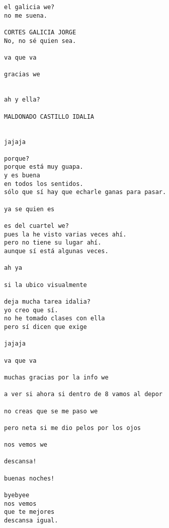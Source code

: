 \begin{verbatim}
el galicia we?
no me suena.

CORTES GALICIA JORGE
No, no sé quien sea.

va que va

gracias we


ah y ella?

MALDONADO CASTILLO IDALIA
 

jajaja

porque?
porque está muy guapa.
y es buena 
en todos los sentidos.
sólo que sí hay que echarle ganas para pasar.

ya se quien es

es del cuartel we?
pues la he visto varias veces ahí.
pero no tiene su lugar ahí.
aunque sí está algunas veces.

ah ya

si la ubico visualmente

deja mucha tarea idalia? 
yo creo que sí.
no he tomado clases con ella
pero sí dicen que exige

jajaja

va que va

muchas gracias por la info we

a ver si ahora si dentro de 8 vamos al depor

no creas que se me paso we

pero neta si me dio pelos por los ojos

nos vemos we

descansa!

buenas noches!

byebyee
nos vemos
que te mejores 
descansa igual.
\end{verbatim}